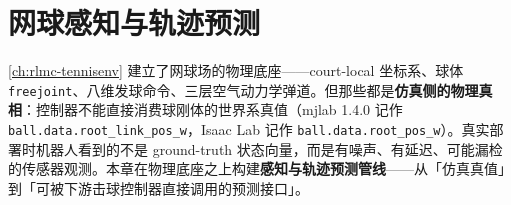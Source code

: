 \chapter{网球感知与轨迹预测}\label{ch:rlmc-tennisperc}


\cref{ch:rlmc-tennisenv} 建立了网球场的物理底座——court-local 坐标系、球体 \verb|freejoint|、八维发球命令、三层空气动力学弹道。但那些都是\textbf{仿真侧的物理真相}：控制器不能直接消费球刚体的世界系真值（mjlab 1.4.0 记作 \verb|ball.data.root_link_pos_w|，Isaac Lab 记作 \verb|ball.data.root_pos_w|）。真实部署时机器人看到的不是 ground-truth 状态向量，而是有噪声、有延迟、可能漏检的传感器观测。本章在物理底座之上构建\textbf{感知与轨迹预测管线}——从「仿真真值」到「可被下游击球控制器直接调用的预测接口」。

